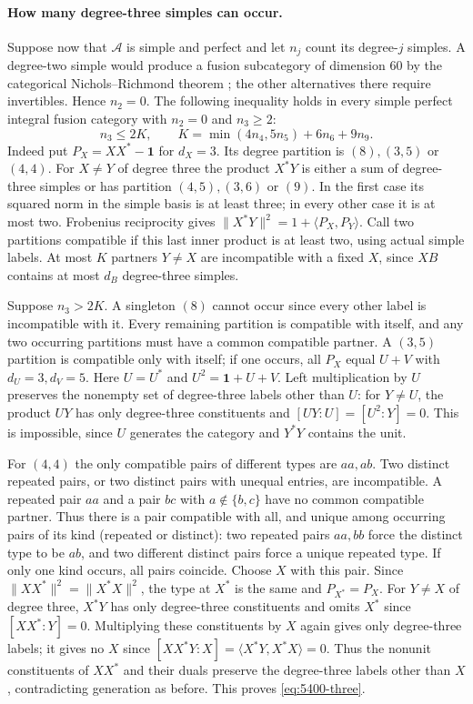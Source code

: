 \documentclass[11pt,a4paper]{article}
\numberwithin{equation}{section}
\theoremstyle{remark}
\newcommand{\one}{\mathbf1}
\begin{document}
\paragraph{How many degree-three simples can occur.}
Suppose now that $\mathcal A$ is simple and perfect and let $n_j$
count its degree-$j$ simples. A degree-two simple would produce a
fusion subcategory of dimension $60$ by the categorical
Nichols--Richmond theorem \cite[Theorem~3.4]{DNVFrobenius};
the other alternatives there require invertibles. Hence $n_2=0$.
The following inequality holds in every simple perfect integral fusion
category with $n_2=0$ and $n_3\ge2$:
\begin{equation}\label{eq:5400-three}
 n_3\le 2K,\qquad K=\min(4n_4,5n_5)+6n_6+9n_9 .
\end{equation}
Indeed put $P_X=XX^*-\one$ for $d_X=3$.
Its degree partition is $(8),(3,5)$ or $(4,4)$. For $X\ne Y$ of
degree three the product $X^*Y$ is either a sum of degree-three
simples or has partition $(4,5),(3,6)$ or $(9)$. In the first case its
squared norm in the simple basis is at least three; in every other
case it is at most two. Frobenius reciprocity gives
$\|X^*Y\|^2=1+\langle P_X,P_Y\rangle$. Call two partitions
compatible if this last inner product is at least two, using actual
simple labels. At most $K$ partners $Y\ne X$ are incompatible with
a fixed $X$, since $X B$ contains at most $d_B$ degree-three simples.

Suppose $n_3>2K$. A singleton $(8)$ cannot occur since every other
label is incompatible with it. Every remaining partition is compatible
with itself, and any two occurring partitions must have a common
compatible partner. A $(3,5)$ partition is compatible only with
itself; if one occurs, all $P_X$ equal $U+V$ with $d_U=3,d_V=5$.
Here $U=U^*$ and $U^2=\one+U+V$. Left multiplication by $U$
preserves the nonempty set of degree-three labels other than $U$:
for $Y\ne U$, the product $UY$ has only degree-three constituents and
$[UY:U]=[U^2:Y]=0$. This is impossible, since $U$ generates the
category and $Y^*Y$ contains the unit.

For $(4,4)$ the only compatible pairs of different types are $aa,ab$.
Two distinct repeated pairs, or two distinct pairs with unequal
entries, are incompatible. A repeated pair $aa$ and a pair $bc$
with $a\notin\{b,c\}$ have no common compatible partner. Thus there
is a pair compatible with all, and unique among occurring pairs of
its kind (repeated or distinct): two repeated pairs $aa,bb$ force
the distinct type to be $ab$, and two different distinct pairs force
a unique repeated type. If only one kind occurs, all pairs coincide.
Choose $X$ with this pair. Since $\|XX^*\|^2=\|X^*X\|^2$, the type
at $X^*$ is the same and $P_{X^*}=P_X$. For $Y\ne X$ of degree three,
$X^*Y$ has only degree-three constituents and omits $X^*$ since
$[XX^*:Y]=0$. Multiplying these constituents by $X$ again gives
only degree-three labels; it gives no $X$ since
$[XX^*Y:X]=\langle X^*Y,X^*X\rangle=0$. Thus the nonunit
constituents of $XX^*$ and their duals preserve the degree-three
labels other than $X$, contradicting generation as before.
This proves \eqref{eq:5400-three}.
\end{document}
